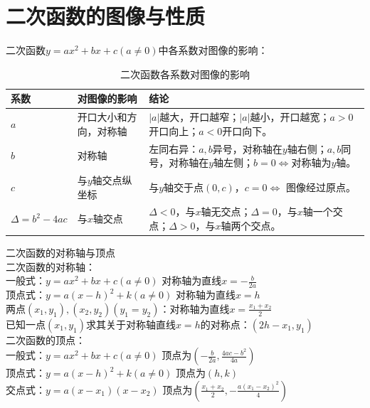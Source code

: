 \section{二次函数的图像与性质}
\begin{theorem}
    二次函数$y=ax^2+bx+c(a\ne 0)$中各系数对图像的影响：
\end{theorem}
\begin{table}[H]
    \centering
    \caption{二次函数各系数对图像的影响}
    \begin{tabular}{l|l|p{8cm}}
        \hline
        \hline
        系数               & 对图像的影响      & 结论                                                                       \\
        \hline
        $a$              & 开口大小和方向，对称轴 & $|a|$越大，开口越窄；$|a|$越小，开口越宽；$a>0$开口向上；$a<0$开口向下。                           \\
        $b$              & 对称轴         & 左同右异：$a,b$异号，对称轴在$y$轴右侧；$a,b$同号，对称轴在$y$轴左侧；$b=0\Leftrightarrow$对称轴为$y$轴。 \\
        $c$              & 与$y$轴交点纵坐标  & 与$y$轴交于点$(0,c)$，$c=0\Leftrightarrow$ 图像经过原点。                             \\
        $\Delta=b^2-4ac$ & 与$x$轴交点     & $\Delta<0$，与$x$轴无交点；$\Delta=0$，与$x$轴一个交点；$\Delta>0$，与$x$轴两个交点。           \\
        \hline
        \hline
    \end{tabular}
\end{table}
\begin{theorem}
    二次函数的对称轴与顶点 \\
    二次函数的对称轴：\\
    一般式：$y=ax^2+bx+c(a\ne 0)$ 对称轴为直线$x=-\frac{b}{2a}$ \\
    顶点式：$y=a(x-h)^2+k(a\ne 0)$ 对称轴为直线$x=h$ \\
    两点$(x_1,y_1),(x_2,y_2)(y_1=y_2)$：对称轴为直线$x=\frac{x_1+x_2}{2}$ \\
    已知一点$(x_1,y_1)$求其关于对称轴直线$x=h$的对称点：$(2h-x_1,y_1)$ \\
    二次函数的顶点： \\
    一般式：$y=ax^2+bx+c(a\ne 0)$ 顶点为$(-\frac{b}{2a},\frac{4ac-b^2}{4a})$ \\
    顶点式：$y=a(x-h)^2+k(a\ne 0)$ 顶点为$(h,k)$ \\
    交点式：$y=a(x-x_1)(x-x_2)$ 顶点为$(\frac{x_1+x_2}{2},-\frac{a(x_1-x_2)^2}{4})$
\end{theorem}
